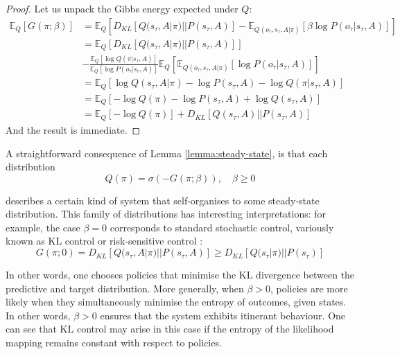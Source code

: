 \documentclass[review,12pt,authoryear]{elsarticle}
\begin{document}
\begin{proof}
Let us unpack the Gibbs energy expected under $Q$:
\begin{equation}
    \begin{split}
        \mathbb E_Q[G(\pi; \beta)] &=\mathbb E_Q[D_{KL}[Q(s_\tau, A|\pi)||P(s_\tau,A)]-\mathbb E_{Q(o_\tau, s_\tau, A|\pi)} [\beta \log P(o_\tau |s_\tau, A)]] \\
        &= \mathbb E_Q[D_{KL}[Q(s_\tau, A|\pi)||P(s_\tau,A)]]\\
        &-\frac{\mathbb E_Q[\log Q(\pi|s_\tau,A)]}{\mathbb E_Q[\log P(o_\tau|s_\tau,A)]} \mathbb E_Q [\mathbb E_{Q(o_\tau, s_\tau, A|\pi)} [ \log P(o_\tau |s_\tau, A)]] \\
        &= \mathbb E_Q[\log Q(s_\tau, A|\pi)-\log P(s_\tau, A)-\log Q(\pi |s_\tau,A)] \\
        &= \mathbb E_Q[-\log Q(\pi)-\log P(s_\tau, A)+\log Q(s_\tau,A)] \\
        &= \mathbb E_Q[-\log Q(\pi)] +D_{KL}[Q(s_\tau,A)||P(s_\tau, A)]
    \end{split}
\end{equation}
And the result is immediate.
\end{proof}

A straightforward consequence of Lemma \ref{lemma:steady-state}, is that each distribution
\begin{equation}
    \label{eq:posterior_gibbs}
   Q(\pi) =\sigma(-G(\pi; \beta)),\quad \beta \geq 0
\end{equation}

describes a certain kind of system that self-organises to some steady-state distribution. This family of distributions has interesting interpretations: for example, the case $\beta=0$ corresponds to standard stochastic control, variously known as KL control or risk-sensitive control \citep{vandenbroekRiskSensitivePath2010}: 
\begin{equation}
    G(\pi; 0) = D_{KL}[Q(s_\tau, A|\pi)||P(s_\tau, A)] \geq D_{KL}[Q(s_\tau |\pi)||P(s_\tau)]
\end{equation}

In other words, one chooses policies that minimise the KL divergence between the predictive and target distribution. More generally, when $\beta >0$, policies are more likely when they simultaneously minimise the entropy of outcomes, given states. In other words, $\beta >0$ ensures that the system exhibits itinerant behaviour. One can see that KL control may arise in this case if the entropy of the likelihood mapping remains constant with respect to policies.
\end{document}
